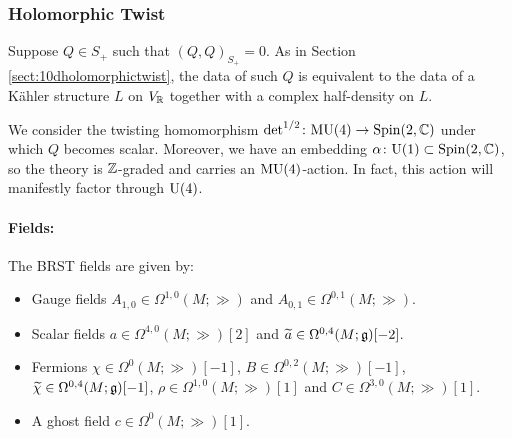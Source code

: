 \documentclass[10pt, oneside]{article}
\begin{document}
\subsubsection{Holomorphic Twist}
\label{sect:8dholomorphictwist}

Suppose $Q\in S_+$ such that $(Q, Q)_{S_+}=0$. As in Section \ref{sect:10dholomorphictwist}, the data of such $Q$ is equivalent to the data of a K\"ahler structure $L$ on $V_\mathbb R$ together with a complex half-density on $L$.

We consider the twisting homomorphism $\det^{1/2}\colon \mathrm{MU}(4)\rightarrow \mathrm{Spin}(2, \mathbb C)$ under which $Q$ becomes scalar. Moreover, we have an embedding $\alpha\colon \mathrm{U}(1)\subset\mathrm{Spin}(2, \mathbb C)$, so the theory is $\mathbb Z$-graded and carries an $\mathrm{MU}(4)$-action. In fact, this action will manifestly factor through $\mathrm{U}(4)$.

\vspace{-10pt}
\paragraph{Fields:} The BRST fields are given by:
\begin{itemize}
\item Gauge fields $A_{1, 0}\in\Omega^{1, 0}(M; \gg)$ and $A_{0, 1}\in\Omega^{0, 1}(M; \gg)$.
\item Scalar fields $a\in\Omega^{4,0}(M; \gg)[2]$ and $\widetilde{a}\in\Omega^{0, 4}(M; \mathfrak{g})[-2]$.
\item Fermions $\chi\in\Omega^0(M; \gg)[-1]$, $B\in\Omega^{0, 2}(M; \gg)[-1]$, $\widetilde{\chi}\in\Omega^{0, 4}(M; \mathfrak{g})[-1]$, $\rho\in\Omega^{1, 0}(M; \gg)[1]$ and $C\in\Omega^{3,0}(M; \gg)[1]$.
\item A ghost field $c\in \Omega^0(M; \gg)[1]$.
\end{itemize}
\end{document}
